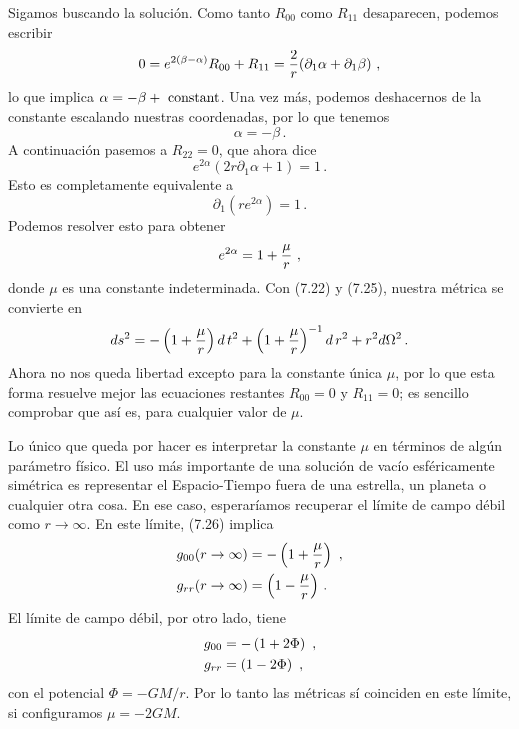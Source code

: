 \documentclass[11pt,b5paper,openany,twoside]{book}
\newcommand{\p}[1]{{\partial_{#1}}}
\begin{document}
Sigamos buscando la solución.
Como tanto $R_{00}$ como $R_{11}$ desaparecen, podemos escribir
\begin{equation}
0=e^{2(\beta-\alpha)}R_{00} + R_{11} = {2\over r}(\p1\alpha+
\p1\beta)\ ,\label{7.21}
\end{equation}
lo que implica $\alpha = -\beta + {\rm~constant}$.
Una vez más, podemos deshacernos de la constante escalando nuestras coordenadas, por lo que tenemos
\begin{equation}
\alpha = -\beta\,.\label{7.22}
\end{equation}
A continuación pasemos a $R_{22}=0$, que ahora dice
\begin{equation}
e^{2\alpha}(2r\p1\alpha+1)=1\,.\label{7.23}
\end{equation}
Esto es completamente equivalente a
\begin{equation}
\p1(r e^{2\alpha})=1\,.\label{7.24}
\end{equation}
Podemos resolver esto para obtener
\begin{equation}
e^{2\alpha}=1+{\mu\over r}\ ,\label{7.25}
\end{equation}
donde $\mu$ es una constante indeterminada.
Con (7.22) y (7.25), nuestra métrica se convierte en
\begin{equation}
ds^2 = -\left(1+{\mu\over r}\right) d\,t^2 +
\left(1+{\mu\over r}\right)^{-1} d\,r^2
+ r^2 d\Omega^2\,.\label{7.26}
\end{equation}
Ahora no nos queda libertad excepto para la constante única $\mu$, por lo que esta forma resuelve mejor las ecuaciones restantes $R_{00}=0$ y $R_{11}=0$; es sencillo comprobar que así es, para cualquier valor de $\mu$.

Lo único que queda por hacer es interpretar la constante $\mu$ en términos de algún parámetro físico.
El uso más importante de una solución de vacío esféricamente simétrica es representar el Espacio-Tiempo fuera de una estrella, un planeta o cualquier otra cosa.
En ese caso, esperaríamos recuperar el límite de campo débil como $r\rightarrow\infty$.
En este límite, (7.26) implica
\begin{align}
g_{00}(r\rightarrow\infty)  &=  -\left(1+{\mu\over r}\right)\ , \notag \\
g_{rr}(r\rightarrow\infty)  &=  \left(1-{\mu\over r}\right)\,.
\label{7.27}
\end{align}
El límite de campo débil, por otro lado, tiene
\begin{align}
g_{00}  &=  -\left(1+2\Phi\right)\ , \notag \\
g_{rr}  &=  \left(1-2\Phi\right)\ ,
\label{7.28}
\end{align}
con el potencial $\Phi=-GM/r$.
Por lo tanto las métricas sí coinciden en este límite, si configuramos $\mu = -2GM$.
\end{document}
